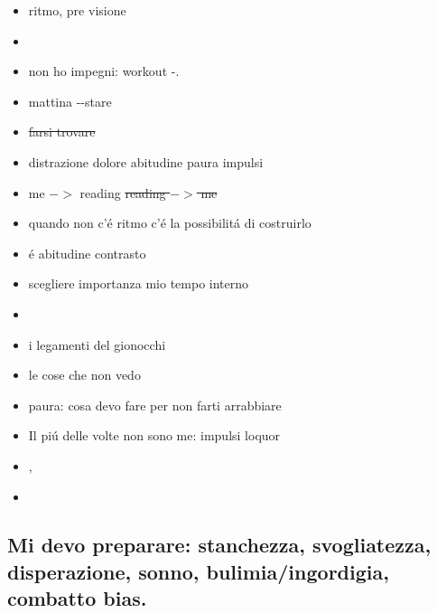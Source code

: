 \begin{itemize}
\item ritmo, pre visione
\item {}
\item non ho impegni: workout -.
\item mattina --stare 
\item {} \sout{farsi trovare}
\item distrazione dolore abitudine paura impulsi 
\item me $->$ reading \sout{reading $->$ me}
\item quando non c'\'e ritmo c'\'e la possibilit\'a di costruirlo
\item {} \'e abitudine contrasto 
\item scegliere importanza mio tempo interno
\item{}
\item i legamenti del gionocchi
\item le cose che non vedo
\item paura: cosa devo fare per non farti arrabbiare
\item Il pi\'u delle volte non sono me: impulsi loquor
\item {}, 
\item {}
\end{itemize}

\subsection{Mi devo preparare: stanchezza, svogliatezza, disperazione, sonno, bulimia/ingordigia, combatto bias.}


